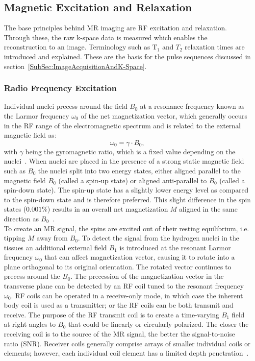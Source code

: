 \subsection{Magnetic Excitation and Relaxation} \label{SubSec:MagneticExcitationAndRelaxation}
The base principles behind MR imaging are RF excitation and relaxation. Through these, the raw k-space data is measured which enables the reconstruction to an image. Terminology such as $\text{T}_1$ and $T_2$ relaxation times are introduced and explained. These are the basis for the pulse sequences discussed in section~\ref{SubSec:ImageAcquisitionAndK-Space}.

\subsubsection{Radio Frequency Excitation}
Individual nuclei precess around the field $B_0$ at a
resonance frequency known as the Larmor frequency $\omega_0$ of the net magnetization vector, which generally occurs in the RF range of the electromagnetic spectrum and is related to the external magnetic field as:
\begin{equation} \label{eq:LarmorFrequency}
	\omega_0 = \gamma \cdot B_0,
\end{equation}
with $\gamma$ being the gyromagnetic ratio, which is a fixed value depending on the nuclei~\cite{SamplingStrategies}. When nuclei are placed in the presence of a strong static magnetic field such as $B_0$ the nuclei split into two energy states, either aligned parallel to the magnetic field $B_0$ (called a spin-up state) or aligned anti-parallel to $B_0$ (called a spin-down state). The spin-up state has a slightly lower energy level as compared to the spin-down state and is therefore preferred. This slight difference in the spin states ($0.001\%$) results in an overall net magnetization $M$ aligned in the same direction as $B_0$~\cite{Serai2021}. \\
To create an MR signal, the spins are excited out of their resting equilibrium, i.e. tipping $M$ away from $B_0$. To detect the signal from the hydrogen nuclei in the tissues an additional external field $B_1$ is introduced at the resonant Larmor frequency $\omega_0$ that can affect magnetization vector, causing it to rotate into a plane orthogonal to its original orientation. The rotated vector continues to precess around the $B_0$. The precession of the magnetization vector in the transverse plane can be detected by an RF coil tuned to the resonant frequency $\omega_0$. RF coils can be operated in a receive-only mode, in which case the inherent body coil is used as a transmitter; or the RF coils can be both transmit and receive. The purpose of the RF transmit coil is to create a time-varying $B_1$ field at right angles to $B_0$ that could be linearly or circularly polarized. The closer the receiving coil is to the source of the MR signal, the better the signal-to-noise ratio (SNR). Receiver coils generally comprise arrays of smaller individual coils or elements; however, each individual coil element has a limited depth penetration~\cite{Serai2021}. \\
